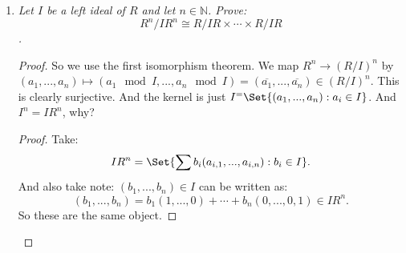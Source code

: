 \documentclass[9pt,reqno,twoside]{amsbook}
\theoremstyle{plain}
\numberwithin{section}{chapter}
\numberwithin{equation}{chapter}
\theoremstyle{definition}
\theoremstyle{remark}
\theoremstyle{plain}
\newcommand{\n}{\mathbb{N}}
\newcommand{\bee}{\begin{equation}\begin{aligned}}
\newcommand{\eee}{\end{aligned}\end{equation}}
\renewcommand{\phi}{\varphi}
\begin{document}
\begin{enumerate}[label=\arabic*.]
\begin{proof}
\bee
	\phi(r((x_1,...,x_n) + B)) 
	&= \phi(r(x_1,...,x_n) + B)\\
	&= \phi(rx_1,...,rx_n) + B)\\
	&= (rx_1 + B,...,rx_n + B)\\
	&= r(x_1 + B,...,x_n + B)\\
	&= r\phi((x_1,...,x_n) + B),
\eee
 so $\phi$ is a homomorphism. \\ 
\textbf{Injection: } Let $(x_1,x_2,...,x_n) + B,(y_1,y_2,...,y_n) + B \in A/B$, and let 
\begin{equation}
\begin{aligned}
\phi((x_1,x_2,...,x_n) + B) &= \phi((y_1,y_2,...,y_n) + B)\\
\Rightarrow  (x_1+B_1,x_2+B_2,...,x_n+B_n)&=(y_1+B_1,y_2+B_2,...,y_n+B_n). 
\end{aligned}
\end{equation}
So then we have that $x_i+B_i = y_i+B_i$ for all $i$, thus
 \begin{equation}
\begin{aligned}(y_1,y_2,...,y_n) + B &= (y_1,y_2,...,y_n)+(B_1 \times B_2 \times \cdots \times B_n)\\
&=
(y_1+B_1 \times y_2+B_2 \times \cdots \times y_n+B_n) \\
&= (x_1+B_1 \times x_2+B_2 \times \cdots \times x_n+B_n) = (x_1,x_2,...,x_n) + B
\end{aligned}
\end{equation}
 by the direct product operation, so $\phi$ is in injective. \\
\textbf{Surjection: } Let $(a_1+B_1,a_2+B_2,...,a_n+B_n) \in C$. Then we must have that $a_i \in A_i$ for all $i$ by definition of $C$ and the quotient modules $A_i/B_i$, so $(a_1,a_2,...,a_n) \in A \Rightarrow (a_1,a_2,...,a_n) + B \in A/B$, and $\phi((a_1,a_2,...,a_n) + B) = (a_1+B_1,a_2+B_2,...,a_n+B_n)$, so $\phi$ is surjective by definition. Hence $\phi$ is an isomorphism, and $A/B \cong C$. 
\end{proof}

\item \textit{Let $I$ be a left ideal of $R$ and let $n \in \n$. Prove: 
$$
R^n/IR^n \cong R/IR \times \cdots \times R/IR
$$. }
\begin{proof}
So we use the first isomorphism theorem. We map $R^n \to (R/I)^n$ by $(a_1,...,a_n) \mapsto (a_1 \mod I,...,a_n \mod I) = (\overline{a_1},...,\overline{a_n}) \in (R/I)^n$. This is clearly surjective. And the kernel is just $I^ = \Set{(a_1,...,a_n): a_i \in I}$. And $I^n = IR^n$, why? \begin{proof}Take:
 $$
 IR^n = \Set{\sum b_i(a_{i,1},...,a_{i,n}):b_i \in I}.
 $$
 And also take note:
 $
 (b_1,...,b_n) \in I$ can be written as:
 $$
 (b_1,...,b_n) = b_1(1,...,0) + \cdots + b_n(0,...,0,1) \in IR^n.
 $$
 So these are the same object. 
 \end{proof}
\end{proof}




\end{enumerate}
\end{document}
